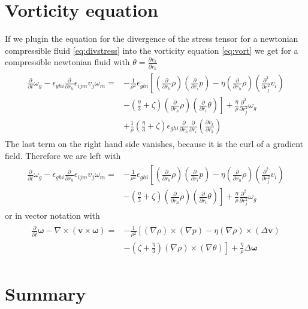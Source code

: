 \documentclass[a4paper,
					12pt,
					twoside,
					openright
					]{book}
\renewcommand{\vec}[1]{\boldsymbol{#1}}
\newcommand{\lra}[1]{{ \left( #1 \right) }}
\newcommand{\pd}[1]{\frac{\partial}{\partial #1}}
\newcommand{\ppd}[2]{\frac{\partial #2}{\partial #1}}
\newcommand{\pdd}[1]{\frac{\partial^2}{\partial #1^2}}
\begin{document}
\section{Vorticity equation}
If we plugin the equation for the divergence of the
stress tensor for a newtonian compressible fluid \eqref{eq:divstress} into
the vorticity equation \eqref{eq:vort} we get for a compressible newtonian
fluid with $\theta=\ppd{r_k}{v_k}$
\begin{align}
\begin{split}
\pd{t}\omega_g
-\epsilon_{ghi}\pd{r_h} \epsilon_{ijm} v_j \omega_m =
&-\frac{1}{\rho^2}\epsilon_{ghi}\left[
\lra{\pd{r_h}\rho} \lra{\pd{r_i}p}
-\eta \lra{\pd{r_h}\rho} \lra{\pdd{r_j}v_i}\right.\\
&\left.-\lra{\frac{\eta}{3}+\zeta} \lra{\pd{r_h}\rho} 
\lra{\pd{r_i}\theta} \right]
+\frac{\eta}{\rho}\pdd{r_j}\omega_g \\
&+\frac{1}{\rho}\lra{\frac{\eta}{3}
+\zeta}\epsilon_{ghi}\pd{r_h}\pd{r_i}\lra{\ppd{r_k}{v_k}}
\end{split}
\end{align}
The last term on the right hand side vanishes, because it is the curl
of a gradient field. Therefore we are left with
\begin{align}
\begin{split}
\pd{t}\omega_g
-\epsilon_{ghi}\pd{r_h} \epsilon_{ijm} v_j \omega_m =
&-\frac{1}{\rho^2}\epsilon_{ghi}\left[
\lra{\pd{r_h}\rho} \lra{\pd{r_i}p}
-\eta \lra{\pd{r_h}\rho} \lra{\pdd{r_j}v_i}\right.\\
&\left.-\lra{\frac{\eta}{3}+\zeta} \lra{\pd{r_h}\rho} 
\lra{\pd{r_i}\theta} \right]
+\frac{\eta}{\rho}\pdd{r_j}\omega_g
\end{split}
\end{align}
or in vector notation with 
\begin{align}
\begin{split}
\pd{t} \vec{\omega}-\nabla \times (\vec{v} \times \vec{\omega}) = 
&-\frac{1}{\rho^2}\left[
(\nabla \rho) \times(\nabla p)
- \eta (\nabla \rho) \times (\Delta \vec{v})\right.\\
&\left.- \lra{\zeta +\frac{\eta}{3}} (\nabla \rho) \times (\nabla
\theta)\right]
+\frac{\eta}{\rho} \Delta \vec{\omega}
\end{split}
\end{align}

\section{Summary}
\end{document}
